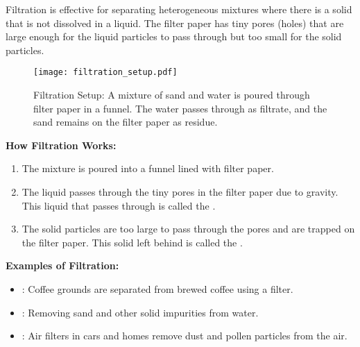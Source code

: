 Filtration is effective for separating heterogeneous mixtures where there is a solid that is not dissolved in a liquid. The filter paper has tiny pores (holes) that are large enough for the liquid particles to pass through but too small for the solid particles.

\begin{figure}
\centering
\texttt{[image: filtration\_setup.pdf]}
\caption{Filtration Setup: A mixture of sand and water is poured through filter paper in a funnel. The water passes through as filtrate, and the sand remains on the filter paper as residue.}
\end{figure}

\textbf{How Filtration Works:}
\begin{enumerate}
    \item The mixture is poured into a funnel lined with filter paper.
    \item The liquid passes through the tiny pores in the filter paper due to gravity. This liquid that passes through is called the .
    \item The solid particles are too large to pass through the pores and are trapped on the filter paper. This solid left behind is called the .
\end{enumerate}

\begin{example}
\textbf{Examples of Filtration:}
\begin{itemize}
    \item {}: Coffee grounds are separated from brewed coffee using a filter.
    \item {}: Removing sand and other solid impurities from water.
    \item {}: Air filters in cars and homes remove dust and pollen particles from the air.
\end{itemize}
\end{example}

